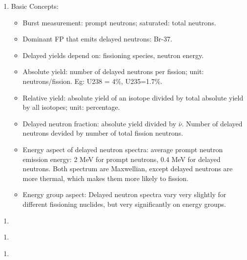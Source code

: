 \documentclass{school-22.211-notes}
\date{May 16, 2012}
\begin{document}
\maketitle


\begin{enumerate}
\item Basic Concepts: 
  \begin{itemize}
  \item Burst measurement: prompt neutrons; saturated: total neutrons. 
  \item Dominant FP that emits delayed neutrons: Br-37. 
  \item Delayed yields depend on: fissioning species, neutron energy.  
  \item Absolute yield: number of delayed neutrons per fission; unit: neutrons/fission. Eg: U238 = 4\%, U235=1.7\%. 
  \item Relative yield: absolute yield of an isotope divided by total absolute yield by all isotopes; unit: percentage. 
  \item Delayed neutron fraction: absolute yield divided by $\bar{\nu}$. Number of delayed neutrons devided by number of total fission neutrons. 
  \item Energy aspect of delayed neutron spectra: average prompt neutron emission energy: 2 MeV for prompt neutrons, 0.4 MeV for delayed neutrons. Both spectrum are Maxwellian, except delayed neutrons are more thermal, which makes them more likely to fission. 
  \item Energy group aspect: Delayed neutron spectra vary very slightly for different fissioning nuclides, but very significantly on energy groups. 
  \end{itemize}
\end{enumerate}


\clearpage
{}
\begin{enumerate}
\item
\end{enumerate}


\clearpage
{}
\begin{enumerate}
\item
\end{enumerate}


\clearpage
{}
\begin{enumerate}
\item
\end{enumerate}
\end{document}
